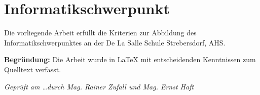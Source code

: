 \documentclass[DLS,
	inreferencehack,
	ohneVgl=false,
	ohneS=false,
	scauthor,
	rundeauslassung=false,
	bookstyle=false,
	widowlines=3,
	titlepage=DLS2017,
	listof=nochaptergap,
	doppelpunkt=false,
	postnotedoppelpunkt=false,
	zitierstil=klassisch]{vwa}
\begin{document}
\vspace{2cm}\noindent

\section*{Informatikschwerpunkt}

Die vorliegende Arbeit erfüllt die Kriterien zur Abbildung des
Informatikschwerpunktes an der De La Salle Schule Strebersdorf, AHS.

\textbf{Begründung:} Die Arbeit wurde in \LaTeX{} mit entscheidenden 
Kenntnissen zum Quelltext verfasst.\vspace{.5\baselineskip}

\noindent\textit{Geprüft am \ldots durch Mag. Rainer Zufall und Mag.
Ernst Haft}
\end{document}
